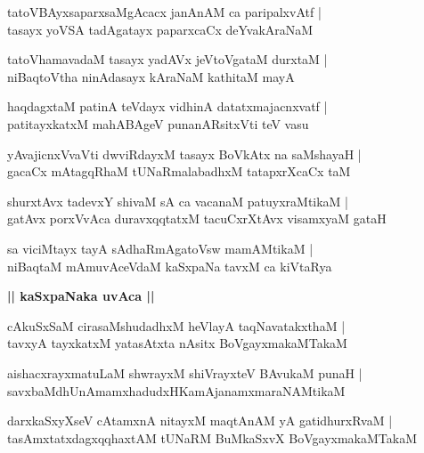 \documentclass[twoside,12pt,openright]{book}
\newcounter{shloka}[chapter]
\def\uvaca#1{\centerline{{\large\textbf{#1}}}}
\begin{document}
\begin{shloka}%
tatoVBAyxsaparxsaMgAcacx janAnAM ca paripalxvAtf |\\
tasayx yoVSA tadAgatayx paparxcaCx deYvakAraNaM 
\end{shloka}

\begin{shloka}%
tatoVhamavadaM tasayx yadAVx jeVtoVgataM durxtaM |\\
niBaqtoVtha ninAdasayx kAraNaM kathitaM mayA 
\end{shloka}

\begin{shloka}%
haqdagxtaM patinA teVdayx vidhinA datatxmajacnxvatf |\\
patitayxkatxM mahABAgeV punanARsitxVti teV vasu 
\end{shloka}

\begin{shloka}%
yAvajicnxVvaVti dwviRdayxM tasayx BoVkAtx na saMshayaH |\\
gacaCx mAtagqRhaM tUNaRmalabadhxM tatapxrXcaCx taM
\end{shloka}

\begin{shloka}%
shurxtAvx tadevxY shivaM sA ca vacanaM patuyxraMtikaM |\\
gatAvx porxVvAca duravxqqtatxM tacuCxrXtAvx visamxyaM gataH 
\end{shloka}

\begin{shloka}%
sa viciMtayx tayA sAdhaRmAgatoVsw mamAMtikaM |\\
niBaqtaM mAmuvAceVdaM kaSxpaNa tavxM  ca kiVtaRya
\end{shloka}

\uvaca{|| kaSxpaNaka uvAca ||}

\begin{shloka}%
cAkuSxSaM cirasaMshudadhxM heVlayA taqNavatakxthaM |\\
tavxyA tayxkatxM yatasAtxta nAsitx BoVgayxmakaMTakaM 
\end{shloka}

\begin{shloka}%
aishacxrayxmatuLaM shwrayxM shiVrayxteV BAvukaM punaH |\\
savxbaMdhUnAmamxhadudxHKamAjanamxmaraNAMtikaM 
\end{shloka}

\begin{shloka}%
darxkaSxyXseV cAtamxnA nitayxM maqtAnAM yA gatidhurxRvaM |\\
tasAmxtatxdagxqqhaxtAM tUNaRM BuMkaSxvX BoVgayxmakaMTakaM 
\end{shloka}
\end{document}
